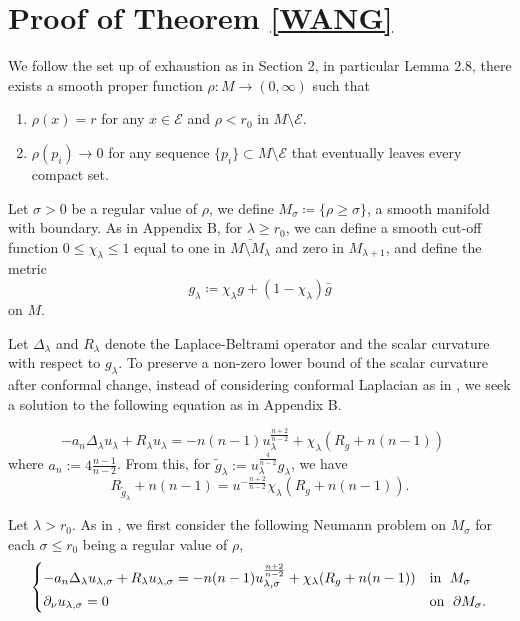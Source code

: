 \documentclass[11pt]{amsart}
\theoremstyle{remark}
\numberwithin{equation}{section}
\def\l{\lambda}
\def\l {\lambda}
\def\s {\sigma}
\begin{document}
{{\section{Proof of Theorem \ref{WANG}}\label{Density}
We follow the set up of exhaustion as in \cite{LLU22} Section 2,  in particular Lemma 2.8, there exists a smooth proper function $\rho : M \to (0,\infty)$ such that
\begin{enumerate}
    \item $\rho(x) = r$ for any $x \in \mathcal E$ and $\rho < r_0$ in $M \setminus \mathcal E$.
    \item $\rho(p_i) \to 0$ for any sequence $\{p_i\} \subset M \setminus \mathcal E$ that eventually leaves every compact set.
\end{enumerate}
Let $\sigma > 0$ be a regular value of $\rho$, we define $M_\sigma \coloneqq \{\rho \geq \sigma\}$, a smooth manifold with boundary.  As in \cite{DGS} Appendix B, for $\lambda \geq r_0$, we can define a smooth cut-off function $0 \leq \chi_\lambda \leq 1$ equal to one in $\overline{M \setminus M_\lambda}$ and zero in $M_{\lambda+1}$, and define the metric
\begin{equation}
    g_\lambda \coloneqq \chi_\lambda g + (1-\chi_\lambda) \bar g
\end{equation}
on $M$. 

Let $\Delta_{\l}$ and $R_{\l}$ denote the Laplace-Beltrami operator and the scalar curvature with respect to $g_\lambda$. To preserve a non-zero lower bound of the scalar curvature after conformal change, instead of considering conformal Laplacian as in \cite{LLU22}, we seek a solution to the following equation as in \cite{DGS} Appendix B.  

\begin{equation}
    \label{DGS}
        -a_n \Delta_{\lambda} u_{\lambda} + R_\lambda u_{\lambda} = -n(n-1) u_{\lambda}^{\frac{n+2}{n-2}} + \chi_{\l}(R_g+n(n-1)) \quad
\end{equation}
where $a_n:= 4 \tfrac{n-1}{n-2}$. 
From this, for $\tilde g_\l:=u_{\l}^{\frac{4}{n-2}}g_{\lambda}$, we have
\begin{equation}
    R_{\tilde g_{\l}}+n(n-1)=u^{-\frac{n+2}{n-2}}\chi_\lambda (R_g+n(n-1)).  
\end{equation}


Let $\l>r_0$. As in \cite{LLU22}, we first consider the following Neumann problem on $M_{\s}$ for each $\sigma\leq r_0$ being a regular value of $\rho$, 
\begin{equation}
    \label{exhaustion}
    \begin{dcases}
        -a_n \Delta_\lambda u_{\lambda,\sigma} + R_\lambda u_{\lambda,\sigma} = -n(n-1) u_{\lambda,\sigma}^{\frac{n+2}{n-2}} +  \chi_{\l}(R_g+n(n-1))  &\text{in } \; M_\sigma 
        \\
        \partial_\nu u_{\l,\sigma} = 0  &\text{on } \; \partial M_\sigma. 
    \end{dcases}
\end{equation}
 
}}
\end{document}
